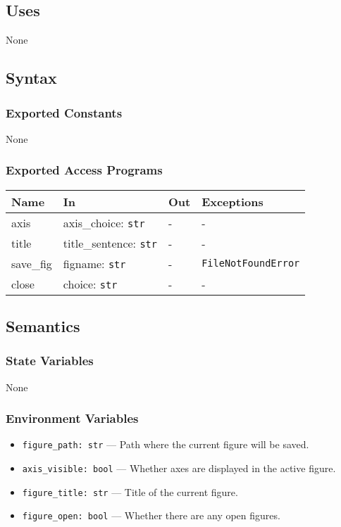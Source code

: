 \documentclass[12pt, titlepage]{article}
\begin{document}
\subsection{Uses}
None

\subsection{Syntax}

\subsubsection{Exported Constants}
None

\subsubsection{Exported Access Programs}

\begin{center}
\begin{tabular}{p{3.2cm} p{5.5cm} p{4cm} p{2.5cm}}
\hline
\textbf{Name} & \textbf{In} & \textbf{Out} & \textbf{Exceptions} \\
\hline
axis & axis\_choice: \texttt{str} & - & - \\
title & title\_sentence: \texttt{str} & - & - \\
save\_fig & figname: \texttt{str} & - & \texttt{FileNotFoundError} \\
close & choice: \texttt{str} & - & - \\
\hline
\end{tabular}
\end{center}

\subsection{Semantics}

\subsubsection{State Variables}
None

\subsubsection{Environment Variables}
\begin{itemize}
  \item \texttt{figure\_path: str} — Path where the current figure will be saved.
  \item \texttt{axis\_visible: bool} — Whether axes are displayed in the active figure.
  \item \texttt{figure\_title: str} — Title of the current figure.
  \item \texttt{figure\_open: bool} — Whether there are any open figures.
\end{itemize}
\end{document}
